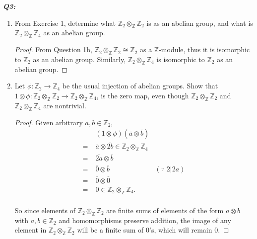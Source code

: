 \documentclass{article}
\begin{document}
\it \textbf{Q3:}
  \begin{enumerate}[label={(\alph*)}]
    \item From Exercise 1, determine what
      $\mathbb{Z}_2\otimes_\mathbb{Z}\mathbb{Z}_2$ is as an abelian group,
      and what is $\mathbb{Z}_2\otimes_\mathbb{Z}\mathbb{Z}_4$ as an
      abelian group.

      \begin{proof}
        From Question 1b, $\mathbb{Z}_2\otimes_\mathbb{Z}\mathbb{Z}_2
        \cong\mathbb{Z}_2$ as a $\mathbb{Z}$-module, thus it is isomorphic
        to $\mathbb{Z}_2$ as an abelian group. Similarly,
        $\mathbb{Z}_2\otimes_\mathbb{Z}\mathbb{Z}_4$ is isomorphic to
        $\mathbb{Z}_2$ as an abelian group.
      \end{proof}

    \item Let $\phi:\mathbb{Z}_2\rightarrow\mathbb{Z}_4$ be the usual
      injection of abelian groups. Show that $1\otimes\phi:
      \mathbb{Z}_2\otimes_\mathbb{Z}\mathbb{Z}_2
      \rightarrow\mathbb{Z}_2\otimes_\mathbb{Z}\mathbb{Z}_4$, is the zero
      map, even though $\mathbb{Z}_2\otimes_\mathbb{Z}\mathbb{Z}_2$ and
      $\mathbb{Z}_2\otimes_\mathbb{Z}\mathbb{Z}_4$ are nontrivial.

      \begin{proof}
        Given arbitrary $a,b\in\mathbb{Z}_2$,
        \begin{align*}
          &\;(1\otimes\phi)(\overline{a}\otimes \overline{b})\\
          =&\;\overline{a}\otimes \overline{2b}
            \in\mathbb{Z}_2\otimes_\mathbb{Z}\mathbb{Z}_4\\
          =&\;\overline{2a}\otimes \overline{b}\\
          =&\;\overline{0}\otimes \overline{b} &(\because\; 2|2a)\\
          =&\;\overline{0}\otimes \overline{0}\\
          =&\;0\in\mathbb{Z}_2\otimes_\mathbb{Z}\mathbb{Z}_4.\\
        \end{align*}

        So since elements of $\mathbb{Z}_2\otimes_\mathbb{Z}\mathbb{Z}_2$
        are finite sums of elements of the form $a\otimes b$ with
        $a,b\in\mathbb{Z}_2$ and homomorphisms preserve addition, the image
        of any element in $\mathbb{Z}_2\otimes_\mathbb{Z}\mathbb{Z}_2$ will
        be a finite sum of $0$'s, which will remain 0.
      \end{proof}
  \end{enumerate}
\end{document}
